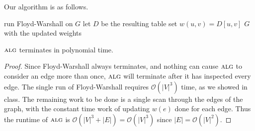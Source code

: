 \documentclass[11pt]{article}
\renewcommand{\O}{\mathcal{O}}
\newcommand{\alg}{\textsc{alg}}
\begin{document}
Our algorithm is as follows.

\begin{algorithm}
  \begin{algorithmic}
      \State run Floyd-Warshall on $G$
      \State let $D$ be the resulting table
          \State set $w(u, v) = D[u, v]$
        \EndIf
      \EndFor
      \State \Return $G$ with the updated weights
    \EndFunction
  \end{algorithmic}
\end{algorithm}

 $\alg$ terminates in polynomial time.
\begin{proof}
  Since Floyd-Warshall always terminates, and nothing can cause $\alg$ to consider an edge more than once, $\alg$ will terminate after it has inspected every edge.
  The single run of Floyd-Warshall requires $\O(|V|^3)$ time, as we showed in class.
  The remaining work to be done is a single scan through the edges of the graph, with the constant time work of updating $w(e)$ done for each edge.
  Thus the runtime of $\alg$ is $\O(|V|^3 + |E|) = \O(|V|^3)$ since $|E| = \O(|V|^2)$.
\end{proof}
\end{document}
